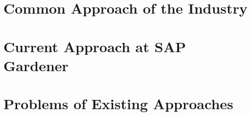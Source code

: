 

\section{Common Approach of the Industry}
\section{Current Approach at SAP Gardener}
\section{Problems of Existing Approaches}